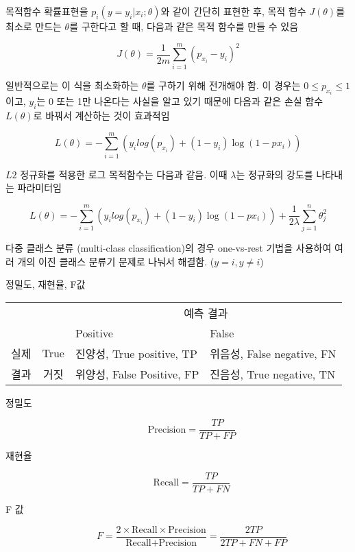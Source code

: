 \documentclass[10pt,t]{beamer}
\begin{document}
\begin{frame}{목적함수}
    확률표현을 $p_i (y= y_i | x_i; \theta)$와 같이 간단히 표현한 후, 목적 함수 $J(\theta)$를 최소로 만드는 $\theta$를 구한다고 할 때, 다음과 같은 목적 함수를 만들 수 있음

    \[J(\theta) = \frac{1}{2m}\sum_{i=1}^{m}(p_{x_i} - y_i)^2\]

    일반적으로는 이 식을 최소화하는 $\theta$를 구하기 위해 전개해야 함. 이 경우는 $0 \leq p_{x_i} \leq 1$이고, $y_i$는 0 또는 1만 나온다는 사실을 알고 있기 때문에 다음과 같은 손실 함수 $L(\theta)$로 바꿔서 계산하는 것이 효과적임

    \[L(\theta) = - \sum_{i=1}^m (y_i log(p_{x_i}) + (1-y_i)\log(1-p{x_i}))\]


    \pagebreak

    $L2$ 정규화를 적용한 로그 목적함수는 다음과 같음. 이때 $\lambda$는 정규화의 강도를 나타내는 파라미터임

    \[L(\theta) = - \sum_{i=1}^m (y_i log(p_{x_i}) + (1-y_i)\log(1-p{x_i})) + \frac{1}{2\lambda}\sum_{j=1}^n \theta_j^2\]

    다중 클래스 분류 (multi-class classification)의 경우 one-vs-rest 기법을 사용하여 여러 개의 이진 클래스 분류기 문제로 나눠서 해결함. ($y=i, y\neq i$)
\end{frame}

\begin{frame}[fragile]{정밀도, 재현율, F값}
    
    \begin{tabular}{|c| c| p{4cm}| p{4cm}|}\hline
        && \multicolumn{2}{c|}{예측 결과}\\ \cline{3-4}
        && Positive & False \\ \hline
        실제 & True& 진양성, True positive, TP & 위음성, False negative, FN \\ \cline{2-4}
        결과& 거짓 & 위양성, False Positive, FP & 진음성, True negative, TN\\ \hline
        
    \end{tabular}
    
    \begin{description}
        \item[정밀도]  \[\text{Precision} = \frac{TP}{TP+FP}\]
        \item[재현율] \[\text{Recall} = \frac{TP}{TP+FN}\]
        \item[F 값] \[F = \frac{2\times \text{Recall} \times \text{Precision}}{\text{Recall} + \text{Precision}} = \frac{2TP}{2TP+FN+ FP}\]
    \end{description}

\end{frame}
    
\end{document}
